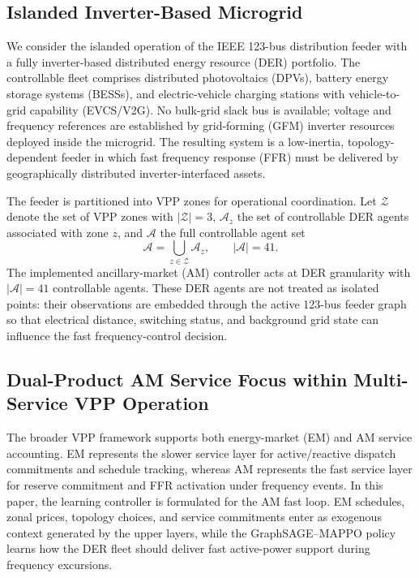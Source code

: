 \label{sec:system}

\subsection{Islanded Inverter-Based Microgrid}
\label{ssec:islanded_microgrid}

We consider the islanded operation of the IEEE 123-bus distribution
feeder with a fully inverter-based distributed energy resource (DER)
portfolio. The controllable fleet comprises distributed photovoltaics
(DPVs), battery energy storage systems (BESSs), and electric-vehicle
charging stations with vehicle-to-grid capability (EVCS/V2G). No
bulk-grid slack bus is available; voltage and frequency references are
established by grid-forming (GFM) inverter resources deployed inside the
microgrid. The resulting system is a low-inertia, topology-dependent
feeder in which fast frequency response (FFR) must be delivered by
geographically distributed inverter-interfaced assets.

The feeder is partitioned into VPP zones for operational coordination.
Let $\mathcal{Z}$ denote the set of VPP zones with $|\mathcal{Z}|=3$,
$\mathcal{A}_z$ the set of controllable DER agents associated with zone
$z$, and $\mathcal{A}$ the full controllable agent set
\begin{equation}
    \mathcal{A}=\bigcup_{z\in\mathcal{Z}}\mathcal{A}_z,
    \qquad |\mathcal{A}|=41.
\end{equation}
The implemented ancillary-market (AM) controller acts at DER granularity
with $|\mathcal{A}|=41$ controllable agents. These DER agents are not
treated as isolated points: their observations are embedded through the
active 123-bus feeder graph so that electrical distance, switching
status, and background grid state can influence the fast
frequency-control decision.

\subsection{Dual-Product AM Service Focus within Multi-Service VPP Operation}
\label{ssec:multiservice_vpp}

The broader VPP framework supports both energy-market (EM) and AM
service accounting. EM represents the slower service layer for
active/reactive dispatch commitments and schedule tracking, whereas AM
represents the fast service layer for reserve commitment and FFR
activation under frequency events. In this paper, the learning
controller is formulated for the AM fast loop. EM schedules, zonal
prices, topology choices, and service commitments enter as exogenous
context generated by the upper layers, while the GraphSAGE--MAPPO policy
learns how the DER fleet should deliver fast active-power support during
frequency excursions.


